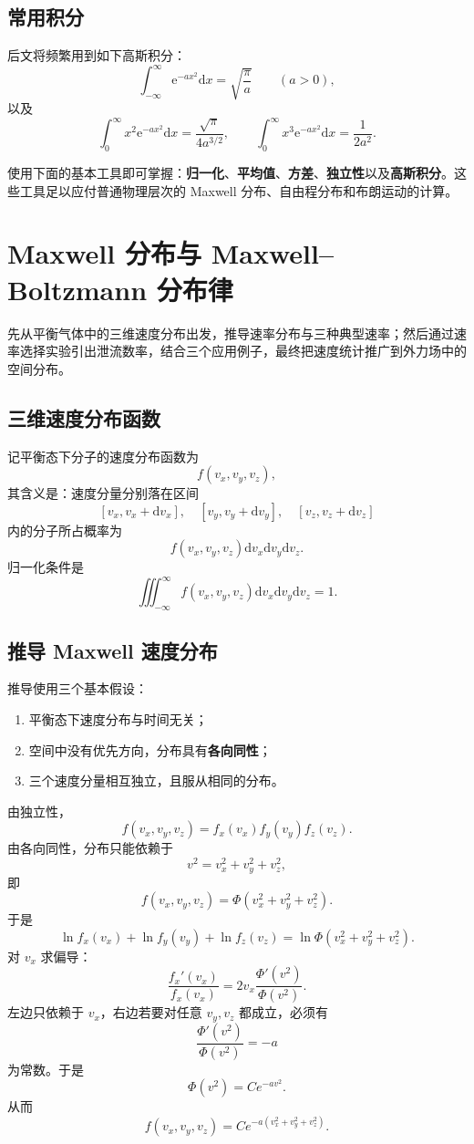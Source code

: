 \documentclass[11pt,a4paper,openany]{ctexbook}
\newcommand{\dd}{\mathrm d}
\newcommand{\ee}{\mathrm e}
\begin{document}
\subsection*{常用积分}
后文将频繁用到如下高斯积分：
\[
\int_{-\infty}^{\infty}\ee^{-ax^2}\dd x
=
\sqrt{\frac{\pi}{a}}
\qquad (a>0),
\]
以及
\[
\int_0^\infty x^2\ee^{-ax^2}\dd x
=
\frac{\sqrt{\pi}}{4a^{3/2}},
\qquad
\int_0^\infty x^3\ee^{-ax^2}\dd x
=
\frac{1}{2a^2}.
\]

\begin{keybox}
使用下面的基本工具即可掌握：\textbf{归一化}、\textbf{平均值}、\textbf{方差}、\textbf{独立性}以及\textbf{高斯积分}。这些工具足以应付普通物理层次的 Maxwell 分布、自由程分布和布朗运动的计算。
\end{keybox}

\section{Maxwell 分布与 Maxwell--Boltzmann 分布律}
先从平衡气体中的三维速度分布出发，推导速率分布与三种典型速率；然后通过速率选择实验引出泄流数率，结合三个应用例子，最终把速度统计推广到外力场中的空间分布。

\subsection*{三维速度分布函数}
记平衡态下分子的速度分布函数为
\[
f(v_x,v_y,v_z),
\]
其含义是：速度分量分别落在区间
\[
[v_x,v_x+\dd v_x],\quad [v_y,v_y+\dd v_y],\quad [v_z,v_z+\dd v_z]
\]
内的分子所占概率为
\[
f(v_x,v_y,v_z)\dd v_x\dd v_y\dd v_z.
\]
归一化条件是
\[
\iiint_{-\infty}^{\infty}
f(v_x,v_y,v_z)\dd v_x\dd v_y\dd v_z=1.
\]

\subsection*{推导 Maxwell 速度分布}
推导使用三个基本假设：

\begin{enumerate}[leftmargin=2.3em]
\item 平衡态下速度分布与时间无关；
\item 空间中没有优先方向，分布具有\textbf{各向同性}；
\item 三个速度分量相互独立，且服从相同的分布。
\end{enumerate}

由独立性，
\[
f(v_x,v_y,v_z)=f_x(v_x)f_y(v_y)f_z(v_z).
\]
由各向同性，分布只能依赖于
\[
v^2=v_x^2+v_y^2+v_z^2,
\]
即
\[
f(v_x,v_y,v_z)=\Phi(v_x^2+v_y^2+v_z^2).
\]
于是
\[
\ln f_x(v_x)+\ln f_y(v_y)+\ln f_z(v_z)
=
\ln \Phi(v_x^2+v_y^2+v_z^2).
\]
对 $v_x$ 求偏导：
\[
\frac{f_x'(v_x)}{f_x(v_x)}
=
2v_x\frac{\Phi'(v^2)}{\Phi(v^2)}.
\]
左边只依赖于 $v_x$，右边若要对任意 $v_y,v_z$ 都成立，必须有
\[
\frac{\Phi'(v^2)}{\Phi(v^2)}=-a
\]
为常数。于是
\[
\Phi(v^2)=Ce^{-av^2}.
\]
从而
\[
f(v_x,v_y,v_z)=Ce^{-a(v_x^2+v_y^2+v_z^2)}.
\]
\end{document}
